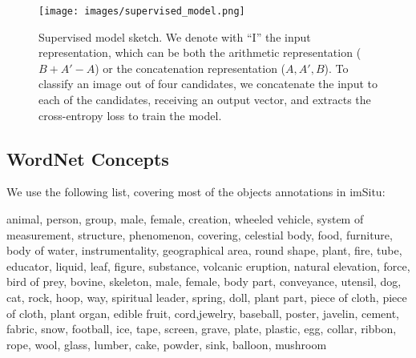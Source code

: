 \documentclass[letterpaper]{article} \usepackage{aaai23}  \usepackage{times}  \usepackage{helvet}  \usepackage{courier}  \usepackage[hyphens]{url}  \usepackage{graphicx} \urlstyle{rm} \def\UrlFont{\rm}  \usepackage{natbib}  \usepackage{caption} \frenchspacing  \setlength{\pdfpagewidth}{8.5in}  \setlength{\pdfpageheight}{11in}  \usepackage{algorithm}
\begin{document}
\begin{figure}[!h]
\centering
\newcommand{\figlen}[0]{\columnwidth}
    \texttt{[image: images/supervised\_model.png]}\\
    \caption{Supervised model sketch. We denote with ``I'' the input representation, which can be both the arithmetic representation ($B+A'-A$) or the concatenation representation ($A,A',B$). To classify an image out of four candidates, we concatenate the input to each of the candidates, receiving an output vector, and extracts the cross-entropy loss to train the model.}
    \label{fig:supervised_model}
\end{figure}

\subsection{WordNet Concepts}
We use the following list, covering most of the objects annotations in imSitu:

animal, person, group, male, female, creation, wheeled vehicle, system of measurement, structure, phenomenon, covering, celestial body, food, furniture, body of water, instrumentality, geographical area, round shape, plant, fire, tube, educator, liquid, leaf, figure, substance, volcanic eruption, natural elevation, force, bird of prey, bovine, skeleton, male, female, body part, conveyance, utensil, dog, cat, rock, hoop, way, spiritual leader, spring, doll, plant part, piece of cloth, piece of cloth, plant organ, edible fruit, cord,jewelry, baseball, poster, javelin, cement, fabric, snow, football, ice, tape, screen, grave, plate, plastic, egg, collar, ribbon, rope, wool, glass, lumber, cake, powder, sink, balloon, mushroom
\end{document}
